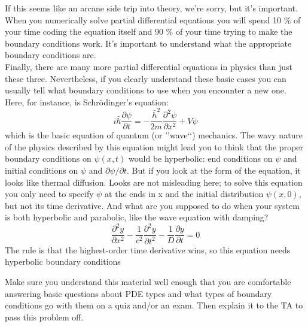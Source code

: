 If this seems like an arcane side trip into theory, we\rq re sorry, but it\rq s important.
When you numerically solve partial differential equations you will spend 10 \%
of your time coding the equation itself and 90 \% of your time trying to make the
boundary conditions work. It\rq s important to understand what the appropriate
boundary conditions are. \\
Finally, there are many more partial differential equations in physics than
just these three. Nevertheless, if you clearly understand these basic cases you
can usually tell what boundary conditions to use when you encounter a new one.
Here, for instance, is Schr{\"o}dinger\rq s equation:
\begin{equation}\label{eq:615}
i \bar{h} \frac{\partial \psi}{\partial t}=-\frac{\bar{h}^{2}}{2 m} \frac{\partial^{2} \psi}{\partial x^{2}} + V \psi
\end{equation}
which is the basic equation of quantum (or \rq\rq wave\lq\lq) mechanics. The wavy nature
of the physics described by this equation might lead you to think that the proper
boundary conditions on $\psi (x,t)$ would be hyperbolic: end conditions on $\psi$ and initial conditions on $\psi$ and $\partial \psi / \partial t$. But if you look at the form of the equation, it
looks like thermal diffusion. Looks are not misleading here; to solve this equation
you only need to specify $\psi$ at the ends in x and the initial distribution $ \psi(x,0)$, but
not its time derivative. And what are you supposed to do when your system is both hyperbolic and
parabolic, like the wave equation with damping?
\begin{equation}\label{eq:616}
\frac{\partial^{2} y}{\partial x^{2}}-\frac{1}{c^{2}} \frac{\partial^{2} y}{\partial t^{2}}-\frac{1}{D} \frac{\partial y}{\partial t}=0
\end{equation}
The rule is that the highest-order time derivative wins, so this equation needs
hyperbolic boundary conditions
\begin{problem}\label{P6.3}  Make sure you understand this material well enough that you are comfortable answering basic questions about PDE types and what types of
boundary conditions go with them on a quiz and/or an exam. Then explain
it to the TA to pass this problem off.\end{problem}